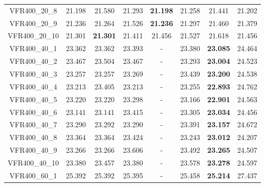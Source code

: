 \begin{tabular}{cc|ccc|ccc}
VFR400\_20\_8      & 21.198           & 21.580           & 21.293           & {\bf 21.198}     & 21.258           & 21.441           & 21.202          \\ 
VFR400\_20\_9      & 21.236           & 21.264           & 21.526           & {\bf 21.236}     & 21.297           & 21.460           & 21.379          \\ 
VFR400\_20\_10     & 21.301           & {\bf 21.301}     & 21.411           & 21.456           & 21.527           & 21.618           & 21.456          \\ 
VFR400\_40\_1      & 23.362           & 23.362           & 23.393           & -                & 23.380           & {\bf 23.085}     & 24.464          \\ 
VFR400\_40\_2      & 23.467           & 23.504           & 23.467           & -                & 23.293           & {\bf 23.004}     & 24.523          \\ 
VFR400\_40\_3      & 23.257           & 23.257           & 23.269           & -                & 23.439           & {\bf 23.200}     & 24.538          \\ 
VFR400\_40\_4      & 23.213           & 23.405           & 23.213           & -                & 23.255           & {\bf 22.893}     & 24.762          \\ 
VFR400\_40\_5      & 23.220           & 23.220           & 23.298           & -                & 23.166           & {\bf 22.901}     & 24.563          \\ 
VFR400\_40\_6      & 23.141           & 23.141           & 23.415           & -                & 23.305           & {\bf 23.034}     & 24.456          \\ 
VFR400\_40\_7      & 23.290           & 23.292           & 23.290           & -                & 23.391           & {\bf 23.157}     & 24.672          \\ 
VFR400\_40\_8      & 23.364           & 23.364           & 23.424           & -                & 23.243           & {\bf 23.012}     & 24.207          \\ 
VFR400\_40\_9      & 23.266           & 23.266           & 23.606           & -                & 23.492           & {\bf 23.265}     & 24.507          \\ 
VFR400\_40\_10     & 23.380           & 23.457           & 23.380           & -                & 23.578           & {\bf 23.278}     & 24.597          \\ 
VFR400\_60\_1      & 25.392           & 25.392           & 25.395           & -                & 25.458           & {\bf 25.214}     & 27.437          \\ 

\end{tabular}
